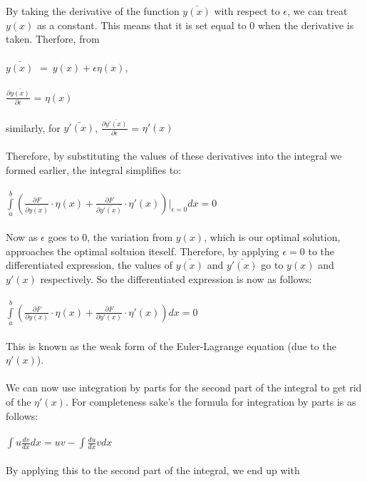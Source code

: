 \documentclass[12pt]{report}
\begin{document}
\\
\\
By taking the derivative of the function $\bar{y(x)}$ with respect to \(\epsilon\), we can treat \(y(x)\) as a constant. This means that it is set equal to \(0\) when the derivative is taken. Therfore, from
\\
\\
$\bar{y(x)}$ \( =\ y(x)+\epsilon\eta (x)\),
\\
\\
\(\frac{\partial\bar{y(x)}}{\partial \epsilon}\) = \(\eta (x)\)
\\
\\
similarly, for \(\bar{y'(x)}\), \(\frac{\partial\bar{y'(x)}}{\partial \epsilon}\) = \(\eta ' (x)\)
\\
\\
Therefore, by substituting the values of these derivatives into the integral we formed earlier, the integral simplifies to:
\\
\\
\(\int\limits_a^b (\frac{\partial F}{\partial \bar{y(x)}} \cdot \eta (x) + \frac{\partial F}{\partial \bar{y'(x)}} \cdot \eta ' (x))|_{\epsilon = 0}dx = 0\)
\\
\\
Now as \(\epsilon\) goes to 0, the variation from \(y(x)\), which is our optimal solution, approaches the optimal soltuion iteself. Therefore, by applying \(\epsilon = 0\) to the differentiated expression, the values of \(\bar{y(x)}\) and \(\bar{y'(x)}\) go to \(y(x)\) and \(y'(x)\) respectively. So the differentiated expression is now as follows:
\\
\\
\(\int\limits_a^b (\frac{\partial F}{\partial y(x)} \cdot \eta (x) + \frac{\partial F}{\partial y'(x)} \cdot \eta ' (x))dx = 0\)
\\
\\
This is known as the weak form of the Euler-Lagrange equation (due to the \(\eta ' (x)\)).
\\
\\
We can now use integration by parts for the second part of the integral to get rid of the \(\eta ' (x)\). For completeness sake's the formula for integration by parts is as follows:
\\
\\
\(\int {u\frac{{dv}}{{dx}}} dx = uv - \int {\frac{{du}}{{dx}}} vdx\)
\\
\\
By applying this to the second part of the integral, we end up with
\end{document}
